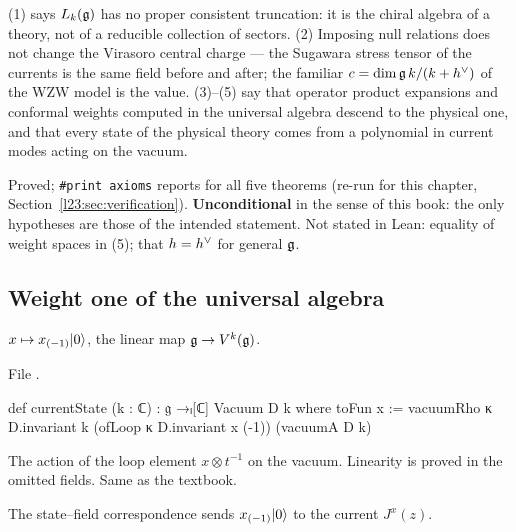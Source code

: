 \begin{physics}
(1) says $L_k(\mathfrak g)$ has no proper consistent truncation: it is the chiral algebra of a theory, not of a reducible collection of
sectors. (2) Imposing null relations does not change the Virasoro central charge --- the Sugawara stress tensor of the currents is the
same field before and after; the familiar $c=\dim\mathfrak g\,k/(k+h^\vee)$ of the WZW model is the value. (3)--(5) say that operator
product expansions and conformal weights computed in the universal algebra descend to the physical one, and that every state of the
physical theory comes from a polynomial in current modes acting on the vacuum.
\end{physics}

\begin{status}
Proved; \texttt{\#print axioms} reports  for all five theorems (re-run for this
chapter, Section~\ref{l23:sec:verification}). \textbf{Unconditional} in the sense of this book: the only hypotheses are those of the
intended statement. Not stated in Lean: equality of weight spaces in (5); that $h=h^\vee$ for general $\mathfrak g$.
\end{status}

\subsection{Weight one of the universal algebra}

\begin{definition}\label{l23:def:currentstate}
$x\mapsto x_{(-1)}|0\rangle$, the linear map $\mathfrak g\to V^k(\mathfrak g)$.
\end{definition}
\noindent File .
\begin{leancode}
def currentState (k : ℂ) : 𝔤 →ₗ[ℂ] Vacuum D k where
  toFun x := vacuumRho κ D.invariant k (ofLoop κ D.invariant x (-1)) (vacuumA D k)
\end{leancode}

\begin{dictionary}
The action of the loop element $x\otimes t^{-1}$ on the vacuum. Linearity is proved in the omitted fields. Same as the textbook.
\end{dictionary}

\begin{physics}
The state--field correspondence sends $x_{(-1)}|0\rangle$ to the current $J^x(z)$.
\end{physics}

